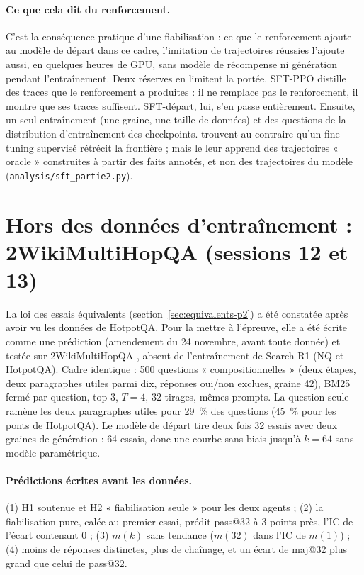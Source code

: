 \paragraph{Ce que cela dit du renforcement.} C'est la conséquence pratique d'une fiabilisation : ce que le renforcement ajoute au modèle de départ dans ce cadre, l'imitation de trajectoires réussies l'ajoute aussi, en quelques heures de GPU, sans modèle de récompense ni génération pendant l'entraînement. Deux réserves en limitent la portée. SFT-PPO distille des traces que le renforcement a produites : il ne remplace pas le renforcement, il montre que ses traces suffisent. SFT-départ, lui, s'en passe entièrement. Ensuite, un seul entraînement (une graine, une taille de données) et des questions de la distribution d'entraînement des checkpoints. \citet{zhai2026does} trouvent au contraire qu'un fine-tuning supervisé rétrécit la frontière ; mais le leur apprend des trajectoires « oracle » construites à partir des faits annotés, et non des trajectoires du modèle (\texttt{analysis/sft\_partie2.py}).

\section{Hors des données d'entraînement : 2WikiMultiHopQA (sessions 12 et 13)}\label{sec:2wiki-p2}

La loi des essais équivalents (section~\ref{sec:equivalents-p2}) a été constatée après avoir vu les données de HotpotQA. Pour la mettre à l'épreuve, elle a été écrite comme une prédiction (amendement du 24 novembre, avant toute donnée) et testée sur 2WikiMultiHopQA \citep{ho2020constructing}, absent de l'entraînement de Search-R1 (NQ et HotpotQA). Cadre identique : 500 questions « compositionnelles » (deux étapes, deux paragraphes utiles parmi dix, réponses oui/non exclues, graine 42), BM25 fermé par question, top 3, $T = 4$, 32 tirages, mêmes prompts. La question seule ramène les deux paragraphes utiles pour 29~\% des questions (45~\% pour les ponts de HotpotQA). Le modèle de départ tire deux fois 32 essais avec deux graines de génération : 64 essais, donc une courbe sans biais jusqu'à $k = 64$ sans modèle paramétrique.

\paragraph{Prédictions écrites avant les données.} (1) H1 soutenue et H2 « fiabilisation seule » pour les deux agents ; (2) la fiabilisation pure, calée au premier essai, prédit pass@32 à 3 points près, l'IC de l'écart contenant 0 ; (3) $m(k)$ sans tendance ($m(32)$ dans l'IC de $m(1)$) ; (4) moins de réponses distinctes, plus de chaînage, et un écart de maj@32 plus grand que celui de pass@32.

